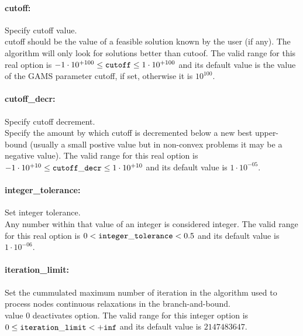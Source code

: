 \paragraph{cutoff:} Specify cutoff value. $\;$ \\
 cutoff should be the value of a feasible solution
known by the user (if any). The algorithm will
only look for solutions better than cutoof. The valid range for this real option is 
$-1 \cdot 10^{+100} \le {\tt cutoff } \le 1 \cdot 10^{+100}$
and its default value is the value of the GAMS parameter cutoff, if set, otherwise it is $10^{100}$.


\paragraph{cutoff\_decr:} Specify cutoff decrement. $\;$ \\
 Specify the amount by which cutoff is decremented
below a new best upper-bound (usually a small
postive value but in non-convex problems it may
be a negative value). The valid range for this real option is 
$-1 \cdot 10^{+10} \le {\tt cutoff\_decr } \le 1 \cdot 10^{+10}$
and its default value is $1 \cdot 10^{-05}$.


\paragraph{integer\_tolerance:} Set integer tolerance. $\;$ \\
 Any number within that value of an integer is
considered integer. The valid range for this real option is 
$0 <  {\tt integer\_tolerance } <  0.5$
and its default value is $1 \cdot 10^{-06}$.


\paragraph{iteration\_limit:} Set the cummulated maximum number of iteration in the algorithm used to process nodes continuous relaxations in the branch-and-bound. $\;$ \\
 value 0 deactivates option. The valid range for this integer option is
$0 \le {\tt iteration\_limit } <  {\tt +inf}$
and its default value is $2147483647$.


